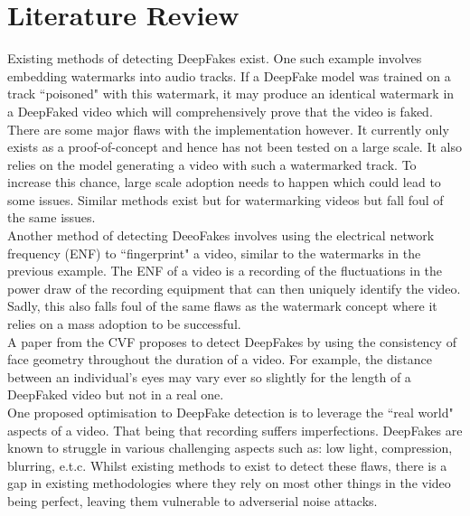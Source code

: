 \documentclass{article}
\begin{document}
\section{Literature Review}

Existing methods of detecting DeepFakes exist. One such example involves embedding watermarks into audio tracks. If a DeepFake model was trained on a track ``poisoned" with this watermark, it may produce an identical watermark in a DeepFaked video which will comprehensively prove that the video is faked\cite{watermark}. There are some major flaws with the implementation however. It currently only exists as a proof-of-concept and hence has not been tested on a large scale. It also relies on the model generating a video with such a watermarked track. To increase this chance, large scale adoption needs to happen which could lead to some issues. Similar methods exist but for watermarking videos but fall foul of the same issues\cite{watermarkvideo}.\\

Another method of detecting DeeoFakes involves using the electrical network frequency (ENF) to ``fingerprint" a video\cite{powerdraw}, similar to the watermarks in the previous example. The ENF of a video is a recording of the fluctuations in the power draw of the recording equipment that can then uniquely identify the video. Sadly, this also falls foul of the same flaws as the watermark concept where it relies on a mass adoption to be successful.\\

A paper from the CVF proposes to detect DeepFakes by using the consistency of face geometry throughout the duration of a video\cite{geometry}. For example, the distance between an individual's eyes may vary ever so slightly for the length of a DeepFaked video but not in a real one.\\

One proposed optimisation to DeepFake detection is to leverage the ``real world" aspects of a video. That being that recording suffers imperfections. DeepFakes are known to struggle in various challenging aspects such as: low light, compression, blurring, e.t.c\cite{horizon}. Whilst existing methods to exist to detect these flaws, there is a gap in existing methodologies where they rely on most other things in the video being perfect, leaving them vulnerable to adverserial noise attacks.
\end{document}
